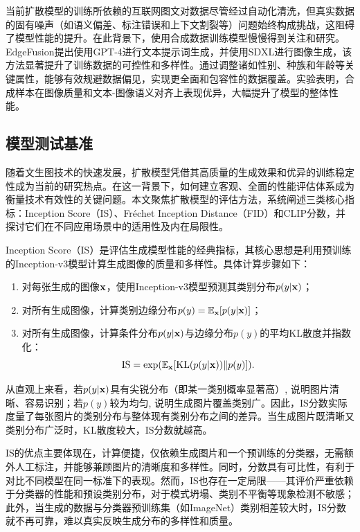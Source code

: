 \documentclass[11pt,a4paper,UTF8]{ctexart}
\begin{document}
当前扩散模型的训练所依赖的互联网图文对数据尽管经过自动化清洗，但真实数据的固有噪声（如语义偏差、标注错误和上下文割裂等）问题始终构成挑战，这阻碍了模型性能的提升。在此背景下，使用合成数据训练模型慢慢得到关注和研究。EdgeFusion\cite{castells2024edgefusion}提出使用GPT-4进行文本提示词生成，并使用SDXL\cite{podell2023sdxl}进行图像生成，该方法显著提升了训练数据的可控性和多样性。通过调整诸如性别、种族和年龄等关键属性，能够有效规避数据偏见，实现更全面和包容性的数据覆盖。实验表明，合成样本在图像质量和文本-图像语义对齐上表现优异，大幅提升了模型的整体性能。




\subsection{模型测试基准}

随着文生图技术的快速发展，扩散模型凭借其高质量的生成效果和优异的训练稳定性成为当前的研究热点。在这一背景下，如何建立客观、全面的性能评估体系成为衡量技术有效性的关键问题。本文聚焦扩散模型的评估方法，系统阐述三类核心指标：Inception Score（IS）\cite{salimans2016improved}、Fr\'echet Inception Distance（FID）\cite{dowson1982frechet}和CLIP分数，并探讨它们在不同应用场景中的适用性及内在局限性。

Inception Score（IS）\cite{salimans2016improved}是评估生成模型性能的经典指标，其核心思想是利用预训练的Inception-v3模型\cite{szegedy2016rethinking}计算生成图像的质量和多样性。具体计算步骤如下：
\begin{enumerate}
    \item 对每张生成的图像$\mathbf{x}$，使用Inception-v3模型预测其类别分布$p(y|\mathbf{x})$；
    \item 对所有生成图像，计算类别边缘分布$p(y)=\mathbb{E}_{\mathbf{x}}[p(y|\mathbf{x})]$；
    \item 对所有生成图像，计算条件分布$p(y|\mathbf{x})$与边缘分布$p(y)$的平均KL散度并指数化： \begin{equation*}
        \text{IS} =\exp(\mathbb{E}_{\mathbf{x}}[\text{KL}(p(y|\mathbf{x}))\|p(y)]).
    \end{equation*}
\end{enumerate}

从直观上来看，若$p(y|\mathbf{x})$具有尖锐分布（即某一类别概率显著高）, 说明图片清晰、容易识别；若$p(y)$较为均匀, 说明生成图片覆盖类别广。因此，IS分数实际度量了每张图片的类别分布与整体现有类别分布之间的差异。当生成图片既清晰又类别分布广泛时，KL散度较大，IS分数就越高。

IS的优点主要体现在，计算便捷，仅依赖生成图片和一个预训练的分类器，无需额外人工标注，并能够兼顾图片的清晰度和多样性。同时，分数具有可比性，有利于对比不同模型在同一标准下的表现。然而，IS也存在一定局限——其评价严重依赖于分类器的性能和预设类别分布，对于模式坍塌、类别不平衡等现象检测不敏感；此外，当生成的数据与分类器预训练集（如ImageNet）类别相差较大时，IS分数就不再可靠，难以真实反映生成分布的多样性和质量。
\end{document}
